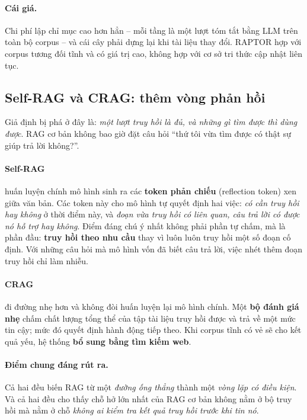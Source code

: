 \paragraph{Cái giá.} Chi phí lập chỉ mục cao hơn hẳn -- mỗi tầng là một lượt tóm tắt bằng LLM trên toàn bộ corpus -- và cái cây phải dựng lại khi tài liệu thay đổi. RAPTOR hợp với corpus tương đối tĩnh và có giá trị cao, không hợp với cơ sở tri thức cập nhật liên tục.

\subsection{Self-RAG và CRAG: thêm vòng phản hồi}
\label{ssec:self_crag}

Giả định bị phá ở đây là: \emph{một lượt truy hồi là đủ, và những gì tìm được thì dùng được}. RAG cơ bản không bao giờ đặt câu hỏi “thứ tôi vừa tìm được có thật sự giúp trả lời không?”.

\paragraph{Self-RAG \cite{asai2023selfrag}} huấn luyện chính mô hình sinh ra các \textbf{token phản chiếu} (reflection token) xen giữa văn bản. Các token này cho mô hình tự quyết định hai việc: \emph{có cần truy hồi hay không} ở thời điểm này, và \emph{đoạn vừa truy hồi có liên quan, câu trả lời có được nó hỗ trợ hay không}. Điểm đáng chú ý nhất không phải phần tự chấm, mà là phần đầu: \textbf{truy hồi theo nhu cầu} thay vì luôn luôn truy hồi một số đoạn cố định. Với những câu hỏi mà mô hình vốn đã biết câu trả lời, việc nhét thêm đoạn truy hồi chỉ làm nhiễu.

\paragraph{CRAG \cite{yan2024crag}} đi đường nhẹ hơn và không đòi huấn luyện lại mô hình chính. Một \textbf{bộ đánh giá nhẹ} chấm chất lượng tổng thể của tập tài liệu truy hồi được và trả về một mức tin cậy; mức đó quyết định hành động tiếp theo. Khi corpus tĩnh có vẻ sẽ cho kết quả yếu, hệ thống \textbf{bổ sung bằng tìm kiếm web}.

\paragraph{Điểm chung đáng rút ra.} Cả hai đều biến RAG từ một \emph{đường ống thẳng} thành một \emph{vòng lặp có điều kiện}. Và cả hai đều cho thấy chỗ hở lớn nhất của RAG cơ bản không nằm ở bộ truy hồi mà nằm ở chỗ \emph{không ai kiểm tra kết quả truy hồi trước khi tin nó}.

